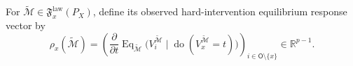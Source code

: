 For \(\widetilde{\mathcal M}\in\mathfrak F_x^{\mathrm{law}}(P_X)\), define its observed hard-intervention equilibrium response vector by
\[
 \rho_x(\widetilde{\mathcal M})
 =\left(
 \frac{\partial}{\partial t}\operatorname{Eq}_{\widetilde{\mathcal M}}
 \bigl(V_i^{\widetilde{\mathcal M}}\mid\operatorname{do}(V_x^{\widetilde{\mathcal M}}=t)\bigr)
 \right)_{i\in\mathsf O\setminus\{x\}}
 \in\mathbb R^{p-1}.
\]